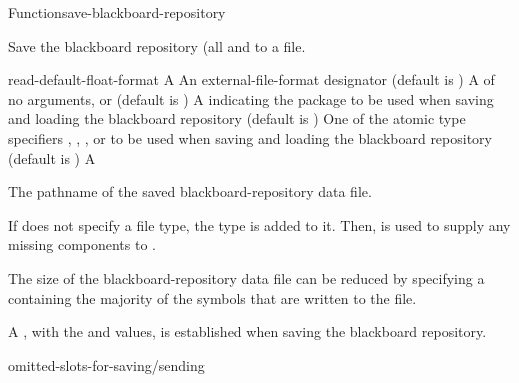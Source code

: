 \documentclass[10pt,twoside,english,pdftex]{article}
\begin{document}

\begin{functiondoc}{Function}{save-blackboard-repository}%
  {
      
    \returns{} }
%
% 

\fnsyntax 

\fnpurpose Save the blackboard repository (all  and
 to a file.

\fnpackage {}

\fnmodule {}

\fnargs
\begin{args}{read-default-float-format}
\arg[pathname] A 
 An external-file-format designator (default is
  )
 A  of no arguments, or
  \nil{} (default is \nil)
\arg[package] A  indicating the package to be used
when saving and loading the blackboard repository (default is
)
 One of the atomic type specifiers
, , , or
 to be used when saving and loading the blackboard repository
(default is )
 A 
\end{args}

\fnreturns The pathname of the saved blackboard-repository data file.

\fndescription If  does not specify a file type, the type
 is added to it.  Then,  is used to
supply any missing components to .

The size of the blackboard-repository data file can be reduced by specifying a
 containing the majority of the symbols that are written to the
file.

A \textbf{}, with the
 and  values, is
established when saving the blackboard repository.

\begin{alsos}{omitted-slots-for-saving/sending}
\end{alsos}


\end{functiondoc}
\end{document}
